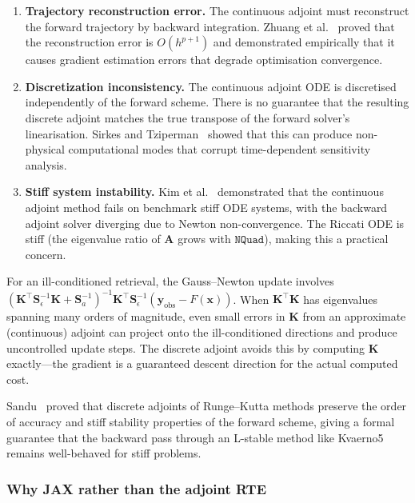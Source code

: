 \documentclass[11pt,a4paper]{article}
\newcommand{\vect}[1]{\bm{#1}}
\newcommand{\mat}[1]{\mathbf{#1}}
\theoremstyle{definition}
\begin{document}
\begin{enumerate}[nosep]
  \item \textbf{Trajectory reconstruction error.}  The continuous adjoint
    must reconstruct the forward trajectory by backward integration.
    Zhuang et al.~\cite{zhuang2020} proved that the reconstruction
    error is $O(h^{p+1})$ and demonstrated empirically that it causes
    gradient estimation errors that degrade optimisation convergence.

  \item \textbf{Discretization inconsistency.}  The continuous adjoint
    ODE is discretised independently of the forward scheme.  There is
    no guarantee that the resulting discrete adjoint matches the true
    transpose of the forward solver's linearisation.  Sirkes and
    Tziperman~\cite{sirkes1997} showed that this can produce
    non-physical computational modes that corrupt time-dependent
    sensitivity analysis.

  \item \textbf{Stiff system instability.}  Kim et
    al.~\cite{kim2021stiff} demonstrated that the continuous adjoint
    method fails on benchmark stiff ODE systems, with the backward
    adjoint solver diverging due to Newton non-convergence.  The
    Riccati ODE is stiff (the eigenvalue ratio of $\mat{A}$ grows with
    $\texttt{NQuad}$), making this a practical concern.
\end{enumerate}

For an ill-conditioned retrieval, the Gauss--Newton update involves
$(\mat{K}^\top \mat{S}_\epsilon^{-1}\mat{K} + \mat{S}_a^{-1})^{-1}
\mat{K}^\top \mat{S}_\epsilon^{-1}(\vect{y}_{\mathrm{obs}} - F(\vect{x}))$.
When $\mat{K}^\top\mat{K}$ has eigenvalues spanning many orders of
magnitude, even small errors in $\mat{K}$ from an approximate
(continuous) adjoint can project onto the ill-conditioned directions and
produce uncontrolled update steps.  The discrete adjoint avoids this by
computing $\mat{K}$ exactly---the gradient is a guaranteed descent
direction for the actual computed cost.

Sandu~\cite{sandu2006} proved that discrete adjoints of Runge--Kutta
methods preserve the order of accuracy and stiff stability properties
of the forward scheme, giving a formal guarantee that the backward pass
through an L-stable method like Kvaerno5 remains well-behaved for stiff
problems.

\subsubsection{Why JAX rather than the adjoint RTE}
\end{document}

